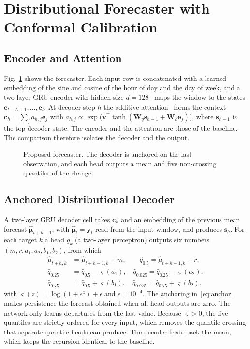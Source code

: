 \section{Distributional Forecaster with Conformal Calibration}
\label{sec:method}
\subsection{Encoder and Attention}
Fig.~\ref{fig:arch} shows the forecaster. Each input row is concatenated with a learned embedding of the sine and cosine of the hour of day and the day of week, and a two-layer GRU encoder with hidden size $d=128$~\cite{cho2014learning} maps the window to the states $\mathbf{e}_{t-L+1},\dots,\mathbf{e}_t$. At decoder step $h$ the additive attention~\cite{bahdanau2015neural} forms the context $\mathbf{c}_h=\sum_{j}a_{h,j}\mathbf{e}_j$ with $a_{h,j}\propto\exp\big(\mathbf{v}^\top\tanh(\mathbf{W}_q\mathbf{s}_{h-1}+\mathbf{W}_k\mathbf{e}_j)\big)$, where $\mathbf{s}_{h-1}$ is the top decoder state. The encoder and the attention are those of the baseline. The comparison therefore isolates the decoder and the output.

\begin{figure}[t]
  \centering
  \resizebox{\columnwidth}{!}{}
  \caption{Proposed forecaster. The decoder is anchored on the last observation, and each head outputs a mean and five non-crossing quantiles of the change.}
  \label{fig:arch}
\end{figure}

\subsection{Anchored Distributional Decoder}
A two-layer GRU decoder cell takes $\mathbf{c}_h$ and an embedding of the previous mean forecast $\hat{\boldsymbol{\mu}}_{t+h-1}$, with $\hat{\boldsymbol{\mu}}_{t}=\mathbf{y}_t$ read from the input window, and produces $\mathbf{s}_h$. For each target $k$ a head $g_k$ (a two-layer perceptron) outputs six numbers $(m,r,a_1,a_2,b_1,b_2)$, from which
\begin{align}
\hat{\mu}_{t+h,k}&=\hat{\mu}_{t+h-1,k}+m, \qquad \hat{q}_{0.5}=\hat{\mu}_{t+h-1,k}+r,\label{eq:anchor}\\
\hat{q}_{0.25}&=\hat{q}_{0.5}-\varsigma(a_1),\quad \hat{q}_{0.025}=\hat{q}_{0.25}-\varsigma(a_2),\nonumber\\
\hat{q}_{0.75}&=\hat{q}_{0.5}+\varsigma(b_1),\quad \hat{q}_{0.975}=\hat{q}_{0.75}+\varsigma(b_2),\nonumber
\end{align}
with $\varsigma(z)=\log(1+e^{z})+\epsilon$ and $\epsilon=10^{-4}$. The anchoring in~\eqref{eq:anchor} makes persistence the forecast obtained when all head outputs are zero. The network only learns departures from the last value. Because $\varsigma>0$, the five quantiles are strictly ordered for every input, which removes the quantile crossing that separate quantile heads can produce. The decoder feeds back the mean, which keeps the recursion identical to the baseline.

